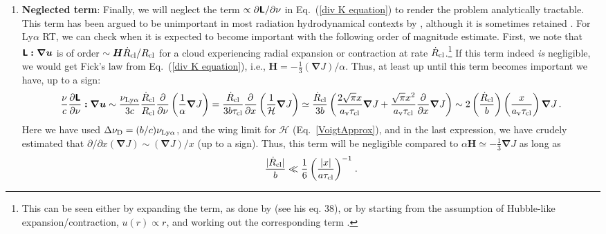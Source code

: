 \documentclass[fleqn,usenatbib]{mnras}
\newcommand{\taucl}{\tau_{\rm cl}}
\begin{document}
\begin{enumerate}
    \item \textbf{Neglected term}: Finally, we will neglect the term $\propto \partial \textbf{\textsf{L}}/\partial \nu$ in Eq.~(\ref{div K equation}) to render the problem analytically tractable. This term has been argued to be unimportant in most radiation hydrodynamical contexts by \cite{Buchler1983} \citep[see also][]{Castor2004}, although it is sometimes retained \citep[e.g.][]{Hillier2012}. For Ly$\alpha$ RT, we can check when it is expected to become important with the following order of magnitude estimate. First, we note that $\textbf{\textsf{L}} \boldsymbol{: \nabla u}$ is of order $\sim \boldsymbol{H} \Dot{R}_{\rm cl}/R_{\rm cl}$ for a cloud experiencing radial expansion or contraction at rate $\Dot{R}_{\rm cl}$.\footnote{This can be seen either by expanding the term, as done by \cite{Buchler1983} (see his eq. 38), or by starting from the assumption of Hubble-like expansion/contraction, $u(r) \propto r$, and working out the corresponding term \citep[e.g.][]{Mihalas1975, Hillier2012}.} If this term indeed \textit{is} negligible, we would get Fick's law from Eq.~(\ref{div K equation}), i.e., $\boldsymbol{H} = -\frac{1}{3} (\boldsymbol{\nabla}J)/\alpha$. Thus, at least up until this term becomes important we have, up to a sign:
    \begin{equation}
        \dfrac{\nu}{c }  \dfrac{\partial \mathbfss{L}}{\partial \nu} \boldsymbol{:} \boldsymbol{\nabla u} \sim \dfrac{\nu_{\rm Ly\alpha}}{3c} \dfrac{\Dot{R}_{\rm cl}}{R_{\rm cl}} \dfrac{\partial }{\partial \nu} \left( \dfrac{1}{\alpha} \boldsymbol{\nabla} J \right) = \dfrac{\Dot{R}_{\rm cl}}{3b \taucl} \dfrac{\partial }{\partial x} \left( \dfrac{1}{\mathcal{H}} \boldsymbol{\nabla} J \right) \simeq \dfrac{\Dot{R}_{\rm cl}}{3b }  \left( \dfrac{2 \sqrt{\pi} x}{a_{\rm v}\taucl} \boldsymbol{\nabla}J + \dfrac{\sqrt{\pi}x^2}{a_{\rm v}\taucl} \dfrac{\partial }{\partial x} \boldsymbol{\nabla} J \right) \sim 2 \left( \dfrac{\Dot{R}_{\rm cl}}{b } \right) \left( \dfrac{ x}{a_{\rm v}\taucl}\right) \boldsymbol{\nabla}J \, .
    \end{equation}
    Here we have used $\Delta \nu_{\rm D} = (b/c) \nu_{\rm Ly\alpha}$, and the wing limit for $\mathcal{H}$ (Eq.~\ref{VoigtApprox}), and in the last expression, we have crudely estimated that $\partial/\partial x (\boldsymbol{\nabla}J) \sim (\boldsymbol{\nabla}J)/x$ (up to a sign). Thus, this term will be negligible compared to $\alpha \boldsymbol{H} \simeq - \frac{1}{3}\boldsymbol{\nabla}J$ as long as
    \begin{equation}
        \dfrac{\lvert \Dot{R}_{\rm cl} \rvert}{b} \ll \dfrac{1}{6} \left(\dfrac{\lvert x \rvert}{a \taucl} \right)^{-1} \hspace{1 pt} .

\end{equation}
\end{enumerate}
\end{document}
